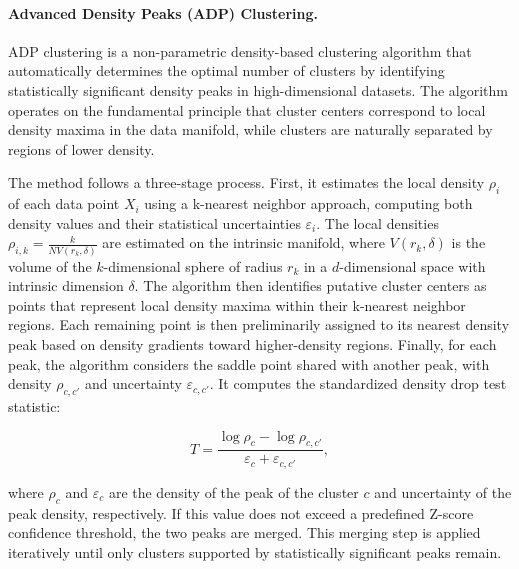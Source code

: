 \paragraph{Advanced Density Peaks (ADP) Clustering.}

ADP clustering \cite{derricoAutomaticTopographyHighdimensional2021} is a non-parametric density-based clustering algorithm that automatically determines the optimal number of clusters by identifying statistically significant density peaks in high-dimensional datasets. The algorithm operates on the fundamental principle that cluster centers correspond to local density maxima in the data manifold, while clusters are naturally separated by regions of lower density. 

The method follows a three-stage process. First, it estimates the local density $\rho_i$ of each data point $X_i$ using a k-nearest neighbor approach, computing both density values and their statistical uncertainties $\varepsilon_i$. The local densities $\rho_{i, k} = \frac{k}{N V(r_{k}, \delta)}$ are estimated on the intrinsic manifold, where $V(r_{k}, \delta)$ is the volume of the $k$-dimensional sphere of radius $r_{k}$ in a $d$-dimensional space with intrinsic dimension $\delta$. The algorithm then identifies putative cluster centers as points that represent local density maxima within their k-nearest neighbor regions. Each remaining point is then preliminarily assigned to its nearest density peak based on density gradients toward higher-density regions. Finally, for each peak, the algorithm considers the saddle point shared with another peak, with density $\rho_{c, c'}$ and uncertainty $\varepsilon_{c, c'}$. It computes the standardized density drop test statistic: 

$$
T = \frac{\log\rho_{c} - \log\rho_{c, c'}}{\varepsilon_{c} + \varepsilon_{c, c'}},
$$

where $\rho_{c}$ and $\varepsilon_{c}$ are the density of the peak of the cluster $c$ and uncertainty of the peak density, respectively. If this value does not exceed a predefined Z-score confidence threshold, the two peaks are merged. This merging step is applied iteratively until only clusters supported by statistically significant peaks remain.


